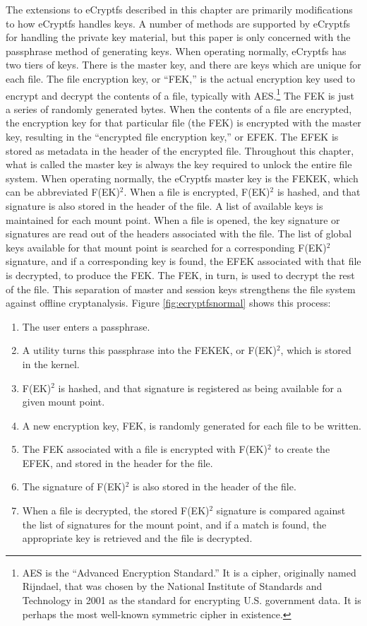 The extensions to eCryptfs described in this chapter are primarily modifications
to how eCryptfs handles keys. A number of methods are supported by eCryptfs for handling the private key material, but this paper is
only concerned with the passphrase method of generating keys. When operating normally, eCryptfs has two tiers of keys.
There is the master key, and there are keys which are unique for each file. The file encryption key, or ``FEK,'' is the actual
encryption key used to encrypt and decrypt the contents of a file, typically with AES.\footnote{AES is the ``Advanced Encryption
Standard.'' It is a cipher, originally named Rijndael, that was chosen by the National Institute of Standards and Technology in 2001
as the standard for encrypting U.S. government data. It is perhaps the most well-known symmetric cipher in existence.}  The FEK is
just a series of randomly generated bytes. When the contents of a file are encrypted, the encryption key for that particular file
(the FEK) is encrypted with the master key, resulting in the ``encrypted file encryption key,'' or EFEK.  The EFEK is stored as
metadata in the header of the encrypted file.  Throughout this chapter, what is called the master key is always the key required to
unlock the entire file system. When operating normally, the eCryptfs master key is the FEKEK, which can be abbreviated
F(EK)$^{2}$.  When a file is encrypted, F(EK)$^{2}$ is hashed, and that signature is also stored in the header of
the file. A list of available keys is maintained for each mount point.  When a file is opened, the key signature or signatures are
read out of the headers associated with the file. The list of global keys available for that mount point is searched for a
corresponding F(EK)$^{2}$ signature, and if a corresponding key is found, the EFEK associated with that file is decrypted,
to produce the FEK. The FEK, in turn, is used to decrypt the rest of the file.  This separation of master and session keys
strengthens the file system against offline cryptanalysis. Figure \ref{fig:ecryptfsnormal} shows this process:

\begin{enumerate}
	\item{The user enters a passphrase.}
	\item{A utility turns this passphrase into the FEKEK, or F(EK)$^{2}$, which is stored in the kernel.}
	\item{F(EK)$^{2}$ is hashed, and that signature is registered as being available for a given mount point.}
	\item{A new encryption key, FEK, is randomly generated for each file to be written.}
	\item{The FEK associated with a file is encrypted with F(EK)$^{2}$ to create the EFEK, and stored in the header for the file.}
	\item{The signature of F(EK)$^{2}$ is also stored in the header of the file.}
	\item{When a file is decrypted, the stored F(EK)$^{2}$ signature is compared against the list of signatures for the mount point,
		and if a match is found, the appropriate key is retrieved and the file is decrypted.}
\end{enumerate}

